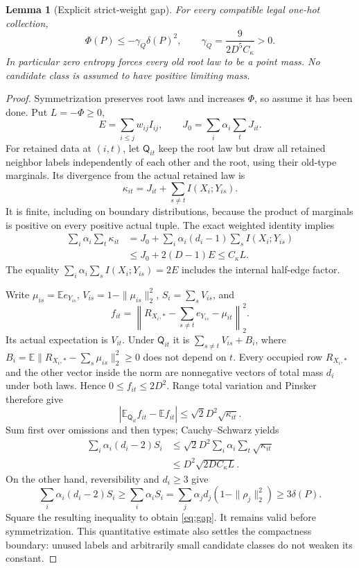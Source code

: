 \documentclass[11pt]{article}
\newtheorem{lemma}{Lemma}
\newcommand{\E}{\mathbb E}
\begin{document}
\begin{lemma}[Explicit strict-weight gap]\label{lem:gap}
For every compatible legal one-hot collection,
\begin{equation}\label{eq:gap}
 \Phi(P)\le-\gamma_Q\delta(P)^2,
 \qquad \gamma_Q=\frac{9}{2D^5C_\kappa}>0.
\end{equation}
In particular zero entropy forces every old root law to be a point mass.
No candidate class is assumed to have positive limiting mass.
\end{lemma}
\begin{proof}
Symmetrization preserves root laws and increases $\Phi$, so assume it has
been done. Put $L=-\Phi\ge0$,
\[
 E=\sum_{i\le j}w_{ij}I_{ij},\qquad
 J_0=\sum_i\alpha_i\sum_tJ_{it}.
\]
For retained data at $(i,t)$, let $\mathsf Q_{it}$ keep the root law
but draw all retained neighbor labels independently of each other and
the root, using their old-type marginals. Its divergence from the actual
retained law is
\[
 \kappa_{it}=J_{it}+\sum_{s\ne t}I(X_i;Y_{is}).
\]
It is finite, including on boundary distributions, because the product
of marginals is positive on every positive actual tuple. The exact
weighted identity implies
\begin{align*}
 \sum_i\alpha_i\sum_t\kappa_{it}
 &=J_0+\sum_i\alpha_i(d_i-1)\sum_sI(X_i;Y_{is})\\
 &\le J_0+2(D-1)E\le C_\kappa L.
\end{align*}
The equality $\sum_i\alpha_i\sum_s I(X_i;Y_{is})=2E$ includes
the internal half-edge factor.

Write $\mu_{is}=\E e_{Y_{is}}$,
$V_{is}=1-\|\mu_{is}\|_2^2$, $S_i=\sum_sV_{is}$, and
\[
 f_{it}=\left\|R_{X_i,*}-\sum_{s\ne t}e_{Y_{is}}-\mu_{it}\right\|_2^2.
\]
Its actual expectation is $V_{it}$. Under $\mathsf Q_{it}$ it is
$\sum_{s\ne t}V_{is}+B_i$, where
$B_i=\E\|R_{X_i,*}-\sum_s\mu_{is}\|_2^2\ge0$ does not depend on $t$.
Every occupied row $R_{X_i,*}$ and the other vector inside the norm
are nonnegative vectors of total mass $d_i$ under both laws. Hence
$0\le f_{it}\le2D^2$. Range total variation and Pinsker therefore give
\[
 |\E_{\mathsf Q_{it}}f_{it}-\E f_{it}|
       \le\sqrt2D^2\sqrt{\kappa_{it}}.
\]
Sum first over omissions and then types; Cauchy--Schwarz yields
\begin{align*}
 \sum_i\alpha_i(d_i-2)S_i
 &\le\sqrt2D^2\sum_i\alpha_i\sum_t\sqrt{\kappa_{it}}\\
 &\le D^2\sqrt{2D C_\kappa L}.
\end{align*}
On the other hand, reversibility and $d_i\ge3$ give
\[
 \sum_i\alpha_i(d_i-2)S_i
 \ge\sum_i\alpha_iS_i
 =\sum_j\alpha_jd_j(1-\|\rho_j\|_2^2)
 \ge3\delta(P).
\]
Square the resulting inequality to obtain \eqref{eq:gap}.
It remains valid before symmetrization. This quantitative estimate also
settles the compactness boundary: unused labels and arbitrarily small
candidate classes do not weaken its constant.
\end{proof}
\end{document}
